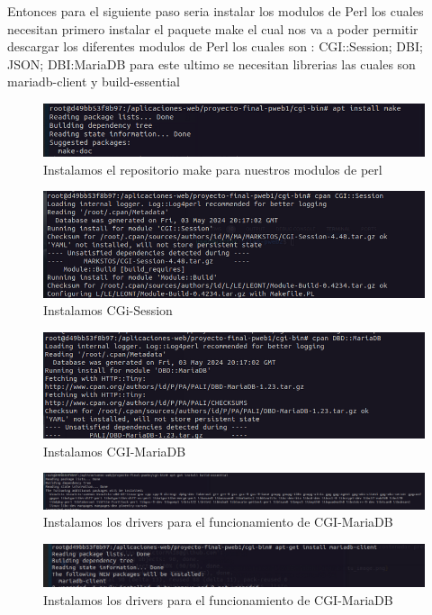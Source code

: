Entonces para el siguiente paso seria instalar los modulos de Perl los cuales necesitan primero instalar el paquete make el cual nos va a poder permitir descargar 
los diferentes modulos de Perl los cuales son : CGI::Session; DBI; JSON; DBI:MariaDB para este ultimo se necesitan librerias las cuales son mariadb-client y build-essential
\begin{figure}[H]
  \centering
  \includegraphics[width=1.0\textwidth]{img/Instalar_make.png}
  \caption{Instalamos el repositorio make para nuestros modulos de perl}
\end{figure}
\begin{figure}[H]
  \centering
  \includegraphics[width=1.0\textwidth]{img/Instalando CGI_Session.png}
  \caption{Instalamos CGi-Session}
\end{figure}
\begin{figure}[H]
  \centering
  \includegraphics[width=1.0\textwidth]{img/Instalando CGI_MariaDB.png}
  \caption{Instalamos CGI-MariaDB}
\end{figure}
\begin{figure}[H]
  \centering
  \includegraphics[width=1.0\textwidth]{img/Driver_MariaDB.png}
  \caption{Instalamos los drivers para el funcionamiento de CGI-MariaDB}
\end{figure}
\begin{figure}[H]
  \centering
  \includegraphics[width=1.0\textwidth]{img/Driver_MariaDB_2.png}
  \caption{Instalamos los drivers para el funcionamiento de CGI-MariaDB}
\end{figure}
